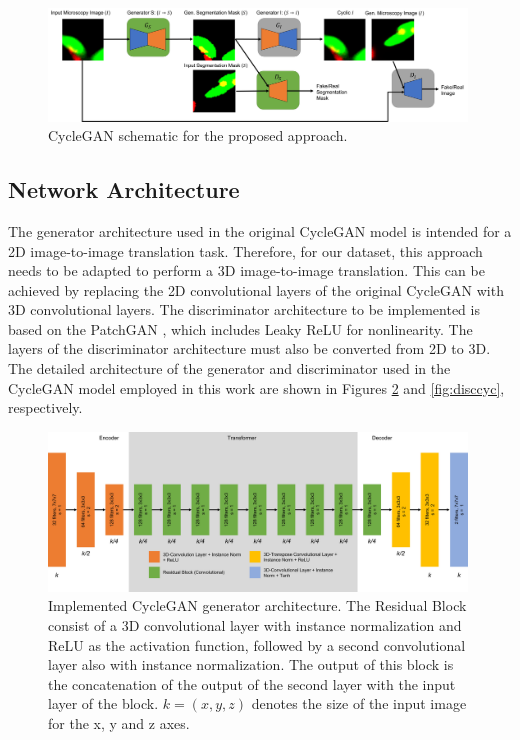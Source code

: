 \begin{figure}[!htb]
  \centering
  \includegraphics[width=0.99\textwidth]{Images/diagrama.jpg}
  \caption{CycleGAN schematic for the proposed approach.}
  \label{fig:diagrama}
\end{figure}


\subsection*{Network Architecture}

The generator architecture used in the original CycleGAN model is intended for a \ac{2D} image-to-image translation task. Therefore, for our dataset, this approach needs to be adapted to perform a \ac{3D} image-to-image translation. This can be achieved by replacing the \ac{2D} convolutional layers of the original CycleGAN with \ac{3D} convolutional layers.  The discriminator architecture to be implemented is based on the PatchGAN \cite{isola2018imagetoimage}, which includes \ac{Leaky ReLU} for nonlinearity. The layers of the discriminator architecture must also be converted from \ac{2D} to \ac{3D}. The detailed architecture of the generator and discriminator used in the CycleGAN model employed in this work are shown in Figures \ref{fig:gencyc} and \ref{fig:disccyc}, respectively.

\begin{figure}[!htb]
  \centering
  \includegraphics[width=0.99\textwidth]{Images/generator_cyclegan.jpg}
  \caption{Implemented CycleGAN generator architecture. The Residual Block consist of a \ac{3D} convolutional layer with instance normalization and \ac{ReLU} as the activation function, followed by a second convolutional layer also with instance normalization. The output of this block is the concatenation of the output of the second layer with the input layer of the block. $k=(x,y,z)$ denotes the size of the input image for the x, y and z axes.}
  \label{fig:gencyc}
\end{figure}

